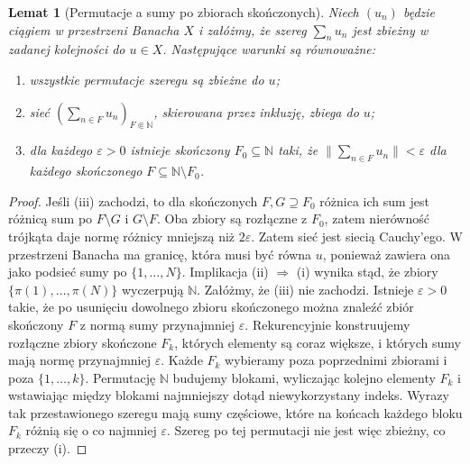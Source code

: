 \documentclass[11pt,a4paper]{article}
\numberwithin{equation}{section}
\theoremstyle{plain}
\newtheorem{lemat}[twierdzenie]{Lemat}
\theoremstyle{definition}
\theoremstyle{remark}
\newcommand{\N}{\mathbb N}
\begin{document}
\begin{lemat}[Permutacje a sumy po zbiorach skończonych]
\label{lem:net-unconditional27}
Niech $(u_n)$ będzie ciągiem w przestrzeni Banacha $X$
i załóżmy, że szereg $\sum_nu_n$ jest zbieżny w zadanej
kolejności do $u\in X$. Następujące warunki są równoważne:
\begin{enumerate}[label=\textup{(\roman*)}]
\item wszystkie permutacje szeregu są zbieżne do $u$;
\item sieć $(\sum_{n\in F}u_n)_{F\Subset\N}$, skierowana przez inkluzję,
 zbiega do $u$;
\item dla każdego $\varepsilon>0$ istnieje skończony $F_0\subseteq\N$
 taki, że $\|\sum_{n\in F}u_n\|<\varepsilon$
 dla każdego skończonego $F\subseteq\N\setminus F_0$.
\end{enumerate}
\end{lemat}
\begin{proof}
Jeśli (iii) zachodzi, to dla skończonych
$F,G\supseteq F_0$ różnica ich sum jest różnicą sum po
$F\setminus G$ i $G\setminus F$. Oba zbiory są rozłączne
z $F_0$, zatem nierówność trójkąta daje normę różnicy
mniejszą niż $2\varepsilon$. Zatem sieć jest
siecią Cauchy'ego. W przestrzeni Banacha ma granicę,
która musi być równa $u$, ponieważ zawiera ona jako podsieć
sumy po $\{1,\ldots,N\}$.
Implikacja (ii) $\Rightarrow$ (i) wynika stąd, że
zbiory $\{\pi(1),\ldots,\pi(N)\}$ wyczerpują $\N$.
Załóżmy, że (iii) nie zachodzi. Istnieje $\varepsilon>0$
takie, że po usunięciu dowolnego zbioru skończonego
można znaleźć zbiór skończony $F$ z normą sumy
przynajmniej $\varepsilon$. Rekurencyjnie konstruujemy
rozłączne zbiory skończone $F_k$, których elementy są coraz
większe, i których sumy mają normę przynajmniej $\varepsilon$.
Każde $F_k$ wybieramy poza poprzednimi zbiorami i poza
$\{1,\ldots,k\}$. Permutację $\N$ budujemy blokami,
wyliczając kolejno elementy $F_k$ i wstawiając
między blokami najmniejszy dotąd niewykorzystany indeks.
Wyrazy tak przestawionego szeregu mają sumy częściowe,
które na końcach każdego bloku $F_k$ różnią się o co najmniej
$\varepsilon$. Szereg po tej permutacji nie jest więc
zbieżny, co przeczy (i).
\end{proof}
\end{document}
